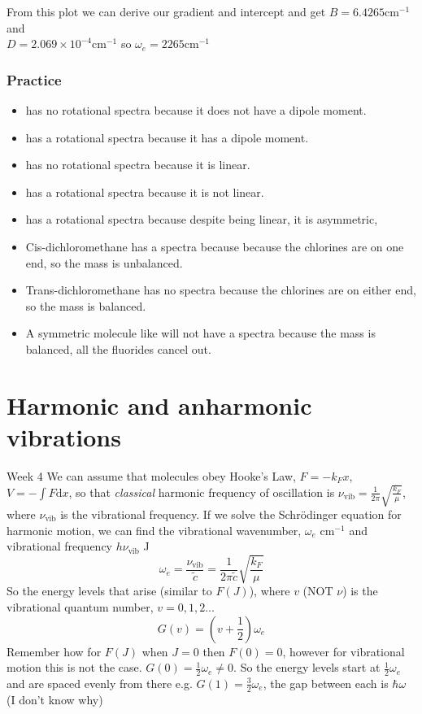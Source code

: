 \documentclass{article}
\newcommand{\thedate}[1]{\hfill{\small\sc #1}}
\newcommand{\mcm}{\text{ cm}^{-1}}
\begin{document}
    From this plot we can derive our gradient and intercept and get $B = 6.4265 \text{cm}^{-1}$ and \\$D=2.069 \times 10^{-4} \text{cm}^{-1}$
    so $\omega_e = 2265 \text{cm} ^{-1}$

    \subsubsection{Practice}
    \begin{itemize}
        \item {} has no rotational spectra because it does not have a dipole moment.
        \item {} has a rotational spectra because it has a dipole moment.
        \item {} has no rotational spectra because it is linear.
        \item {} has a rotational spectra because it is not linear.
        \item {} has a rotational spectra because despite being linear, it is asymmetric, 
        \item Cis-dichloromethane has a spectra because because the chlorines are on one end, so the mass is unbalanced.
        \item Trans-dichloromethane has no spectra because the chlorines are on either end, so the mass is balanced. 
        \item A symmetric molecule like  will not have a spectra because the mass is balanced, all the fluorides cancel out.
    \end{itemize}
    
    \section{Harmonic and anharmonic vibrations}\thedate{Week 4}
    We can assume that molecules obey Hooke's Law, $F= - k_Fx$, $V = -\int F \text{d}x$, so that \emph{classical} harmonic frequency of 
    oscillation is $\nu_\text{vib} = \frac{1}{2\pi}\sqrt{\frac{k_F}{\mu}}$, where $\nu_\text{vib}$ is the 
    vibrational frequency. 
    If we solve the Schr{\"o}dinger equation for harmonic motion, we can find the vibrational wavenumber, 
    $\omega_e \mcm$ and vibrational frequency $h\nu_\text{vib}$ J
    $$\omega_e = \frac{\nu_\text{vib}}{\tilde{c}} = \frac{1}{2\pi\tilde{c}}\sqrt{\frac{k_F}{\mu}}$$
    So the energy levels that arise (similar to $F(J)$), where $v$ (NOT $\nu$) is the vibrational quantum number, $v = 0, 1, 2...$
    $$G(v) = \left(v + \frac{1}{2}\right)\omega_e$$
    Remember how for $F(J)$ when $J = 0$ then $F(0) = 0$, however for vibrational motion this is not the case.
    $G(0) = \frac{1}{2}\omega_e \neq 0$. So the energy levels start at $\frac{1}{2}\omega_e$ and are spaced evenly
    from there e.g. $G(1) = \frac{3}{2}\omega_e$, the gap between each is $\hbar\omega$ (I don't know why)
\end{document}
